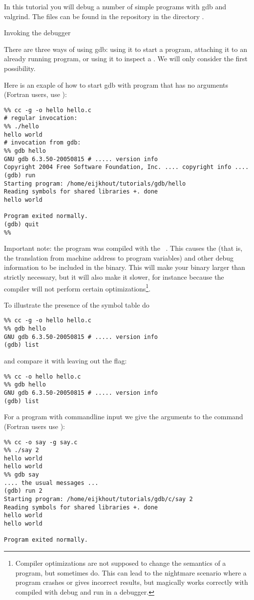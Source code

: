 In this tutorial you will debug a number of simple programs with
gdb and valgrind. The files can be found in the repository
in the directory .


 {Invoking the debugger}

There are three ways of using gdb: using it to start a program,
attaching it to an already running program, or using it to inspect a
. We will only consider the first possibility.

Here is an exaple of how to start gdb with program that has no
arguments (Fortran users, use ):
\begin{verbatim}
%% cc -g -o hello hello.c
# regular invocation:
%% ./hello
hello world
# invocation from gdb:
%% gdb hello
GNU gdb 6.3.50-20050815 # ..... version info
Copyright 2004 Free Software Foundation, Inc. .... copyright info ....
(gdb) run
Starting program: /home/eijkhout/tutorials/gdb/hello 
Reading symbols for shared libraries +. done
hello world

Program exited normally.
(gdb) quit
%%
\end{verbatim}

Important note: the program was compiled with the ~. This causes the  (that is, the
translation from machine address to program variables) and other debug
information to be included in the binary. This will make your binary
larger than strictly necessary, but it will also make it slower, for
instance because the compiler will not perform certain
optimizations\footnote{Compiler optimizations are not supposed to
  change the semantics of a program, but sometimes do. This can lead
  to the nightmare scenario where a program crashes or gives incorrect
  results, but magically works correctly with compiled with debug and
  run in a debugger.}.

To illustrate the presence of the symbol table do
\begin{verbatim}
%% cc -g -o hello hello.c
%% gdb hello
GNU gdb 6.3.50-20050815 # ..... version info
(gdb) list
\end{verbatim}
and compare it with leaving out the  flag:
\begin{verbatim}
%% cc -o hello hello.c
%% gdb hello
GNU gdb 6.3.50-20050815 # ..... version info
(gdb) list
\end{verbatim}

For a program with commandline input we give the arguments to the
 command (Fortran users use ):
\begin{verbatim}
%% cc -o say -g say.c
%% ./say 2
hello world
hello world
%% gdb say
.... the usual messages ...
(gdb) run 2
Starting program: /home/eijkhout/tutorials/gdb/c/say 2
Reading symbols for shared libraries +. done
hello world
hello world

Program exited normally.
\end{verbatim}

